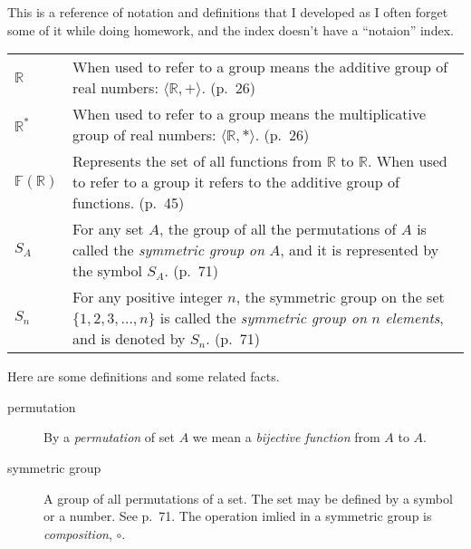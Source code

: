 \documentclass{amsart}
\newcommand{\Reals}{\ensuremath{\mathbb{R}}\xspace}
\begin{document}
This is a reference of notation and definitions that I developed as I
often forget some of it while doing homework, and the index doesn't
have a ``notaion'' index.

\begin{tabular}{lp{4in}}
  $\Reals$ & When used to refer to a group means the additive group of
  real numbers: $\langle \Reals, + \rangle$. (p.~26) \\

  $\Reals^*$ & When used to refer to a group means the multiplicative
  group of real numbers: $\langle \Reals, * \rangle$. (p.~26) \\

  $\mathbb{F}(\Reals)$ & Represents the set of all functions from
  \Reals to \Reals. When used to refer to a group it refers to the
  additive group of functions. (p.~45) \\

  $S_A$ & For any set $A$, the group of all the permutations of $A$
  is called the \emph{symmetric group on} $A$, and it is represented
  by the symbol $S_A$. (p.~71) \\

  $S_n$ & For any positive integer $n$, the symmetric group on the
  set $\{1, 2, 3, \ldots, n \}$ is called the \emph{symmetric group
    on} $n$ \emph{elements}, and is denoted by $S_n$. (p.~71) \\

\end{tabular}

Here are some definitions and some related facts.

\begin{description}
  \item[permutation] By a \emph{permutation} of set $A$ we mean a
    \emph{bijective function} from $A$ to $A$.

  \item[symmetric group] A group of all permutations of a set. The set
    may be defined by a symbol or a number. See p.~71. The operation
    imlied in a symmetric group is \emph{composition}, $\circ$.
\end{description}
\end{document}
